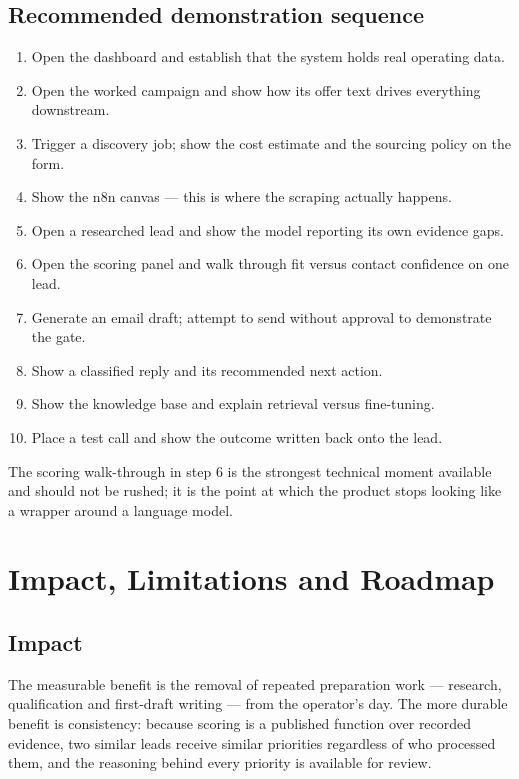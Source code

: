 \documentclass[11pt,a4paper]{report}
\begin{document}
\section{Recommended demonstration sequence}
\begin{enumerate}[leftmargin=1.4em,itemsep=1pt]
  \item Open the dashboard and establish that the system holds real operating data.
  \item Open the worked campaign and show how its offer text drives everything downstream.
  \item Trigger a discovery job; show the cost estimate and the sourcing policy on the form.
  \item Show the n8n canvas --- this is where the scraping actually happens.
  \item Open a researched lead and show the model reporting its own evidence gaps.
  \item Open the scoring panel and walk through fit versus contact confidence on one lead.
  \item Generate an email draft; attempt to send without approval to demonstrate the gate.
  \item Show a classified reply and its recommended next action.
  \item Show the knowledge base and explain retrieval versus fine-tuning.
  \item Place a test call and show the outcome written back onto the lead.
\end{enumerate}

The scoring walk-through in step 6 is the strongest technical moment available and should not be rushed; it is the point at which the product stops looking like a wrapper around a language model.

\chapter{Impact, Limitations and Roadmap}
\label{ch:limits}
\section{Impact}
The measurable benefit is the removal of repeated preparation work --- research, qualification and first-draft writing --- from the operator's day. The more durable benefit is consistency: because scoring is a published function over recorded evidence, two similar leads receive similar priorities regardless of who processed them, and the reasoning behind every priority is available for review.
\end{document}
